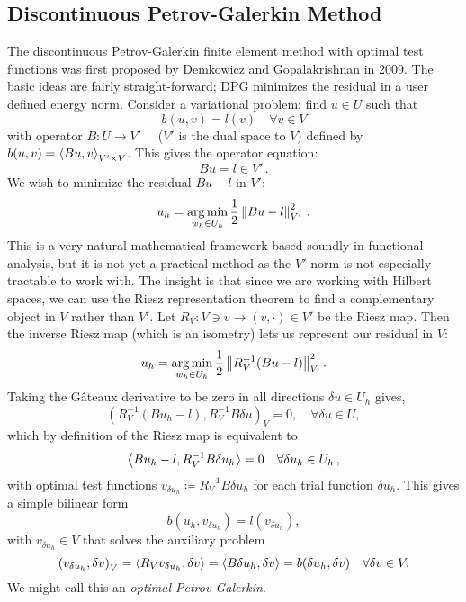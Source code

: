 \documentclass[Dissertation.tex]{subfiles}
\begin{document}

\subsection{Discontinuous Petrov-Galerkin Method}
The discontinuous Petrov-Galerkin finite element method with optimal test functions
was first proposed by Demkowicz and Gopalakrishnan in 2009\cite{DPG1, DPG2}.
The basic ideas are fairly straight-forward; DPG minimizes the residual in a user defined energy norm.
Consider a variational problem: find $u\in U$ such that
\[
b(u,v)=l(v) \quad\forall v\in V
\]
with operator $B:U\rightarrow V'\quad$ ($V'$ is the dual space to $V$) defined by $b(u,v)=\left\langle Bu,v \right\rangle_{V'\times V}$.
This gives the operator equation:
\[
Bu=l\in V'\,.
\]
We wish to minimize the residual $Bu-l$ in $V'$:
\[
u_h=\operatorname*{arg\,min}_{w_h\in U_h}\frac{1}{2}\left\| Bu-l \right\|^2_{V'}\,.
\]
This is a very natural mathematical framework based soundly in functional analysis, but it is not yet a practical method as the $V'$ norm is not
especially tractable to work with.
The insight is that since we are working with Hilbert spaces, we can use the Riesz representation theorem to find a complementary object
in $V$ rather than $V'$. Let $R_V:V\ni v\rightarrow(v,\cdot)\in V'$ be the Riesz map.
Then the inverse Riesz map (which is an isometry) lets us represent our residual in $V$:
\[
u_h=\operatorname*{arg\,min}_{w_h\in U_h}\frac{1}{2}\left\| R_V^{-1}(Bu-l) \right\|^2_{V}\,.
\]
Taking the G\^ateaux derivative to be zero in all directions $\delta u \in
U_h$ gives,
\[
\left(R_V^{-1}(Bu_h-l),R_V^{-1}B\delta u\right)_V = 0, \quad \forall \delta u \in U,
\]
which by definition of the Riesz map is equivalent to
\begin{equation*}
\left\langle Bu_h-l,R_V^{-1}B\delta u_h \right\rangle=0\quad\forall\delta u_h\in U_h\,,
\end{equation*}
with optimal test functions $v_{\delta u_h}\coloneqq R_V^{-1}B\delta u_h$ for each trial function $\delta u_h$.
This gives a simple bilinear form
\begin{equation*}
b(u_h,v_{\delta u_h})=l(v_{\delta u_h}),
\end{equation*}
with $v_{\delta u_h}\in V$ that solves the auxiliary problem
\begin{equation*}
\left( v_{\delta u_h},\delta v \right)_V=\left\langle R_Vv_{\delta u_h},\delta v \right\rangle
=\left\langle B\delta u_h,\delta v \right\rangle=b(\delta u_h,\delta v)\quad\forall\delta v\in V.
\end{equation*}
We might call this an \emph{optimal Petrov-Galerkin}.
\end{document}
